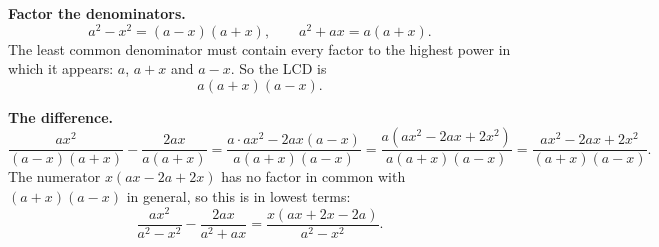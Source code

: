 \textbf{Factor the denominators.}
\[
a^2-x^2=(a-x)(a+x),\qquad a^2+ax=a(a+x).
\]
The least common denominator must contain every factor to the highest power in which it appears: $a$, $a+x$ and $a-x$. So the LCD is
\[
\boxed{a(a+x)(a-x)} .
\]

\textbf{The difference.}
\[
\dfrac{ax^2}{(a-x)(a+x)}-\dfrac{2ax}{a(a+x)}=\dfrac{a\cdot ax^2-2ax(a-x)}{a(a+x)(a-x)}=\dfrac{a\left(ax^2-2ax+2x^2\right)}{a(a+x)(a-x)}=\dfrac{ax^2-2ax+2x^2}{(a+x)(a-x)} .
\]
The numerator $x(ax-2a+2x)$ has no factor in common with $(a+x)(a-x)$ in general, so this is in lowest terms:
\[
\dfrac{ax^2}{a^2-x^2}-\dfrac{2ax}{a^2+ax}=\dfrac{x(ax+2x-2a)}{a^2-x^2}.
\]
